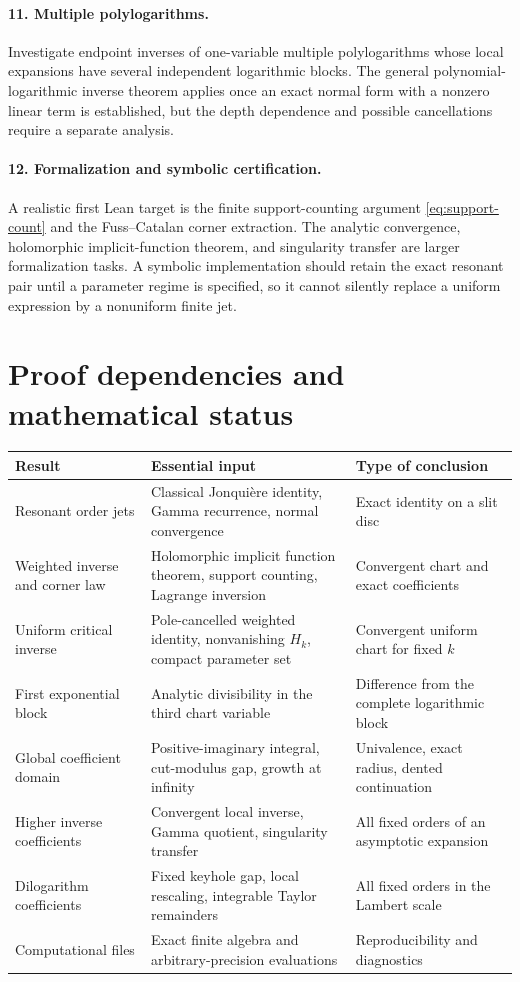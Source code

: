 \documentclass[11pt,a4paper]{article}
\numberwithin{equation}{section}
\theoremstyle{definition}
\theoremstyle{remark}
\begin{document}
\paragraph{11. Multiple polylogarithms.}
Investigate endpoint inverses of one-variable multiple polylogarithms
whose local expansions have several independent logarithmic blocks.
The general polynomial-logarithmic inverse theorem applies once an
exact normal form with a nonzero linear term is established, but
the depth dependence and possible cancellations require a separate analysis.

\paragraph{12. Formalization and symbolic certification.}
A realistic first Lean target is the finite support-counting argument
\eqref{eq:support-count} and the Fuss--Catalan corner extraction.
The analytic convergence, holomorphic implicit-function theorem, and
singularity transfer are larger formalization tasks.
A symbolic implementation should retain the exact resonant pair
until a parameter regime is specified, so it cannot silently replace
a uniform expression by a nonuniform finite jet.

\appendix
\section{Proof dependencies and mathematical status}

\begin{longtable}{@{}>{\raggedright\arraybackslash}p{}
 >{\raggedright\arraybackslash}p{}
 >{\raggedright\arraybackslash}p{}@{}}
\toprule
Result & Essential input & Type of conclusion\\
\midrule
\endhead
Resonant order jets &
Classical Jonqui\`ere identity, Gamma recurrence, normal convergence &
Exact identity on a slit disc\\
Weighted inverse and corner law &
Holomorphic implicit function theorem, support counting, Lagrange inversion &
Convergent chart and exact coefficients\\
Uniform critical inverse &
Pole-cancelled weighted identity, nonvanishing \(H_k\), compact parameter set &
Convergent uniform chart for fixed \(k\)\\
First exponential block &
Analytic divisibility in the third chart variable &
Difference from the complete logarithmic block\\
Global coefficient domain &
Positive-imaginary integral, cut-modulus gap, growth at infinity &
Univalence, exact radius, dented continuation\\
Higher inverse coefficients &
Convergent local inverse, Gamma quotient, singularity transfer &
All fixed orders of an asymptotic expansion\\
Dilogarithm coefficients &
Fixed keyhole gap, local rescaling, integrable Taylor remainders &
All fixed orders in the Lambert scale\\
Computational files &
Exact finite algebra and arbitrary-precision evaluations &
Reproducibility and diagnostics\\
\bottomrule
\end{longtable}
\end{document}
